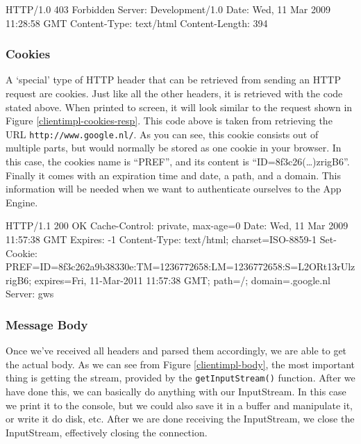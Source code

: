 \begin{figure*}[ht] %
\begin{center}
\begin{code}
HTTP/1.0 403 Forbidden
Server: Development/1.0
Date: Wed, 11 Mar 2009 11:28:58 GMT
Content-Type: text/html
Content-Length: 394
\end{code}
\caption{Another example of HTTP response headers.\label{clientimpl-403}}
\end{center}
\end{figure*}

\subsubsection{Cookies}
\label{clientimpl-cookies}
A `special' type of HTTP header that can be retrieved from sending an HTTP
request are cookies. Just like all the other headers, it is retrieved with the
code stated above. When printed to screen, it will look similar to the request
shown in Figure \ref{clientimpl-cookies-resp}. This code above is taken from
retrieving the URL \texttt{http://www.google.nl/}. As you can see, this cookie
consists out of multiple parts, but would normally be stored as one cookie in your
browser. In this case, the cookies name is ``PREF'', and its content is
``ID=8f3c26(\ldots)zrigB6''. Finally it comes with an expiration time and date,
a path, and a domain. This information will be needed when we want to authenticate
ourselves to the App Engine.

\begin{figure*}[ht] %
\begin{center}
\begin{code}
HTTP/1.1 200 OK
Cache-Control: private, max-age=0
Date: Wed, 11 Mar 2009 11:57:38 GMT
Expires: -1
Content-Type: text/html; charset=ISO-8859-1
Set-Cookie: 
  PREF=ID=8f3c262a9b38330e:TM=1236772658:LM=1236772658:S=L2ORt13rUlzrigB6; 
  expires=Fri, 11-Mar-2011 11:57:38 GMT; path=/; domain=.google.nl
Server: gws
\end{code}
\caption{An HTTP response including cookies.\label{clientimpl-cookies-resp}}
\end{center}
\end{figure*}

\subsubsection{Message Body}
Once we've received all headers and parsed them accordingly, we are able to get
the actual body. As we can see from Figure \ref{clientimpl-body}, the most
important thing is getting the stream, provided by the \texttt{getInputStream()}
function. After we have done this, we can basically do anything with our
InputStream. In this case we print it to the console, but we could also save it
in a buffer and manipulate it, or write it do disk, etc. After we are done
receiving the InputStream, we close the InputStream, effectively closing the
connection.

